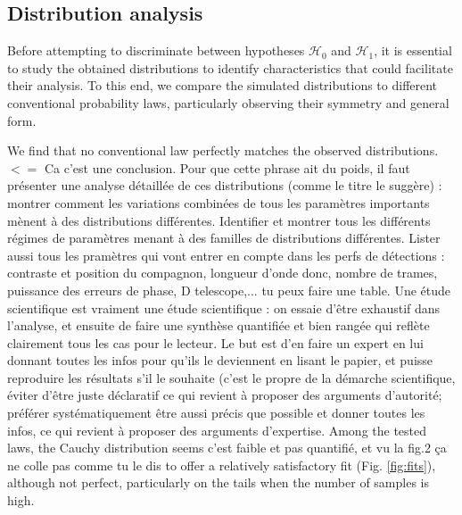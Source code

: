 \documentclass{article}
\newcommand{\dm}[1]{{\color{mulberry} #1}}
\begin{document}
\subsection{Distribution analysis}  \label{sec:distribution_analysis}

Before attempting to discriminate between hypotheses $\mathcal{H}_0$ and $\mathcal{H}_1$, it is essential to study the obtained distributions to identify characteristics that could facilitate their analysis. To this end, we compare the simulated distributions to different conventional probability laws, particularly observing their symmetry and general form.

We find that no conventional law perfectly matches the observed distributions. \dm{$<=$ Ca c'est une conclusion. Pour que cette phrase ait du poids, il faut présenter une analyse détaillée de ces distributions (comme le titre le suggère) : montrer comment les variations combinées de tous les paramètres importants mènent à des distributions différentes. Identifier et montrer tous les différents régimes de paramètres menant à des familles de distributions différentes. Lister aussi tous les pramètres qui vont entrer en compte dans les perfs de détections : contraste et position du compagnon, longueur d'onde donc, nombre de trames, puissance des erreurs de phase, D telescope,... tu peux faire une table. Une étude scientifique est vraiment une étude scientifique : on essaie d'être exhaustif dans l'analyse, et ensuite de faire une synthèse quantifiée et bien rangée qui reflète clairement tous les cas pour le lecteur. Le but est d'en faire un expert en lui donnant toutes les infos pour qu'ils le deviennent en lisant le papier, et puisse reproduire les résultats s'il le souhaite (c'est le propre de la démarche scientifique, éviter d'être juste déclaratif ce qui revient à proposer des arguments d'autorité; préférer systématiquement être aussi précis que possible et donner toutes les infos, ce qui revient à proposer des arguments d'expertise.} Among the tested laws, the Cauchy distribution seems \dm{c'est faible et pas quantifié, et vu la fig.2 ça ne colle pas comme tu le dis} to offer a relatively satisfactory fit (Fig. \ref{fig:fits}), although not perfect, particularly on the tails when the number of samples is high.
\end{document}
